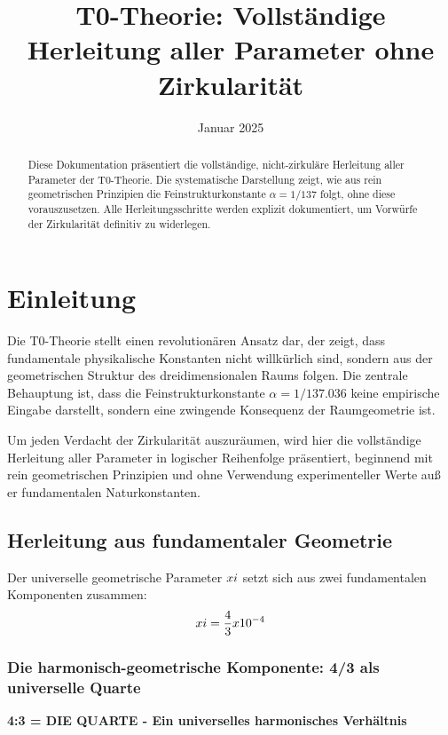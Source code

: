\documentclass[12pt,a4paper]{article}
\title{T0-Theorie: Vollständige Herleitung aller Parameter ohne Zirkularität}
\author{}
\date{Januar 2025}
\begin{document}
	\maketitle
	
	\begin{abstract}
		Diese Dokumentation präsentiert die vollständige, nicht-zirkuläre Herleitung aller Parameter der T0-Theorie. Die systematische Darstellung zeigt, wie aus rein geometrischen Prinzipien die Feinstrukturkonstante $\alpha = 1/137$ folgt, ohne diese vorauszusetzen. Alle Herleitungsschritte werden explizit dokumentiert, um Vorwürfe der Zirkularität definitiv zu widerlegen.
	\end{abstract}
	
	\section{Einleitung}
	
	Die T0-Theorie stellt einen revolutionären Ansatz dar, der zeigt, dass fundamentale physikalische Konstanten nicht willkürlich sind, sondern aus der geometrischen Struktur des dreidimensionalen Raums folgen. Die zentrale Behauptung ist, dass die Feinstrukturkonstante $\alpha = 1/137.036$ keine empirische Eingabe darstellt, sondern eine zwingende Konsequenz der Raumgeometrie ist.
	
	Um jeden Verdacht der Zirkularität auszuräumen, wird hier die vollständige Herleitung aller Parameter in logischer Reihenfolge präsentiert, beginnend mit rein geometrischen Prinzipien und ohne Verwendung experimenteller Werte auß er fundamentalen Naturkonstanten.
\tableofcontents

\subsection{Herleitung aus fundamentaler Geometrie}

Der universelle geometrische Parameter $xi$ setzt sich aus zwei fundamentalen Komponenten zusammen:
\begin{equation}
	xi = \frac{4}{3} x 10^{-4}
\end{equation}

\subsubsection{Die harmonisch-geometrische Komponente: 4/3 als universelle Quarte}

\textbf{4:3 = DIE QUARTE - Ein universelles harmonisches Verhältnis}
\end{document}

